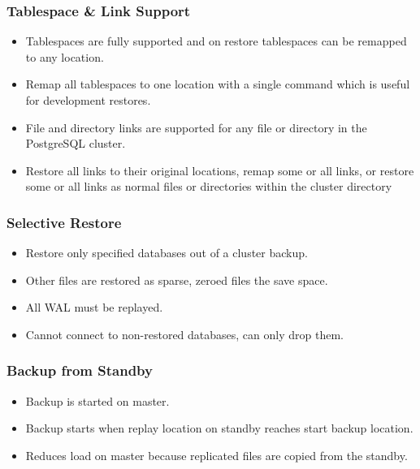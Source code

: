 \begin{frame}
    \frametitle{Tablespace \& Link Support}

    \begin{itemize}
        \item Tablespaces are fully supported and on restore tablespaces can be remapped to any location.\pause
        \item Remap all tablespaces to one location with a single command which is useful for development restores.\pause
    \end{itemize}

    \begin{itemize}
        \item File and directory links are supported for any file or directory in the PostgreSQL cluster.\pause
        \item Restore all links to their original locations, remap some or all links, or restore some or all links as normal files or directories within the cluster directory
    \end{itemize}
\end{frame}

\begin{frame}
    \frametitle{Selective Restore}

    \begin{itemize}
        \item Restore only specified databases out of a cluster backup.\pause
        \item Other files are restored as sparse, zeroed files the save space.\pause
        \item All WAL must be replayed.\pause
        \item Cannot connect to non-restored databases, can only drop them.
    \end{itemize}
\end{frame}

\begin{frame}
    \frametitle{Backup from Standby}

    \begin{itemize}
        \item Backup is started on master.\pause
        \item Backup starts when replay location on standby reaches start backup location.\pause
        \item Reduces load on master because replicated files are copied from the standby.
    \end{itemize}
\end{frame}

